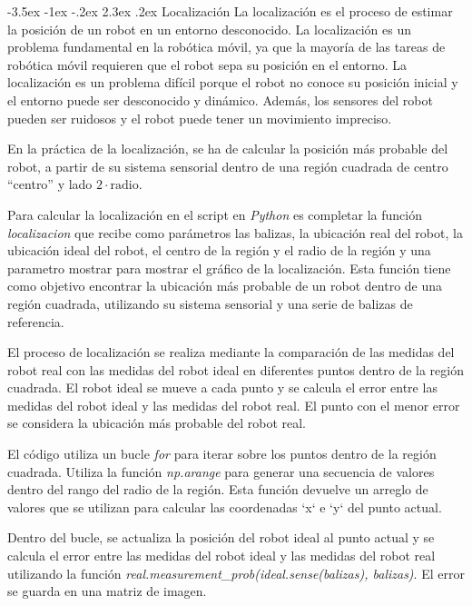 \documentclass[11pt]{report}
\makeatletter
\renewcommand\chapter{\@startsection{chapter}{0}{\z@}%
    {-3.5ex \@plus -1ex \@minus -.2ex}%
    {2.3ex \@plus.2ex}%
    {\normalfont\Large\bfseries}}
\makeatother
\begin{document}
\chapter{Localización}
La localización es el proceso de estimar la posición de un robot en un entorno desconocido. La localización es un problema
fundamental en la robótica móvil, ya que la mayoría de las tareas de robótica móvil requieren que el robot sepa su posición
en el entorno. La localización es un problema difícil porque el robot no conoce su posición inicial y el entorno puede ser
desconocido y dinámico. Además, los sensores del robot pueden ser ruidosos y el robot puede tener un movimiento impreciso.

En la práctica de la localización, se ha de calcular la posición más probable del robot, a partir de su sistema sensorial 
dentro de una región cuadrada de centro “centro” y lado $2 \cdot \text{radio}$.

Para calcular la localización en el script en \emph{Python} es completar la función \emph{localizacion} que recibe como parámetros
las balizas, la ubicación real del robot, la ubicación ideal del robot, el centro de la región y el radio de la región y una parametro
mostrar para mostrar el gráfico de la localización. Esta función tiene como objetivo encontrar la ubicación más probable de un robot 
dentro de una región cuadrada, utilizando su sistema sensorial y una serie de balizas de referencia.

El proceso de localización se realiza mediante la comparación de las medidas del robot real con las medidas del robot ideal en diferentes
puntos dentro de la región cuadrada. El robot ideal se mueve a cada punto y se calcula el error entre las medidas del robot ideal y las
medidas del robot real. El punto con el menor error se considera la ubicación más probable del robot real.

El código utiliza un bucle \emph{for} para iterar sobre los puntos dentro de la región cuadrada. Utiliza la función \emph{np.arange} 
para generar una secuencia de valores dentro del rango del radio de la región. Esta función devuelve un arreglo de valores que se utilizan
para calcular las coordenadas `x` e `y` del punto actual.

Dentro del bucle, se actualiza la posición del robot ideal al punto actual y se calcula el error entre las medidas del robot ideal y las 
medidas del robot real utilizando la función \emph{real.measurement\_prob(ideal.sense(balizas), balizas)}. El error se guarda en una matriz de imagen.
\end{document}
